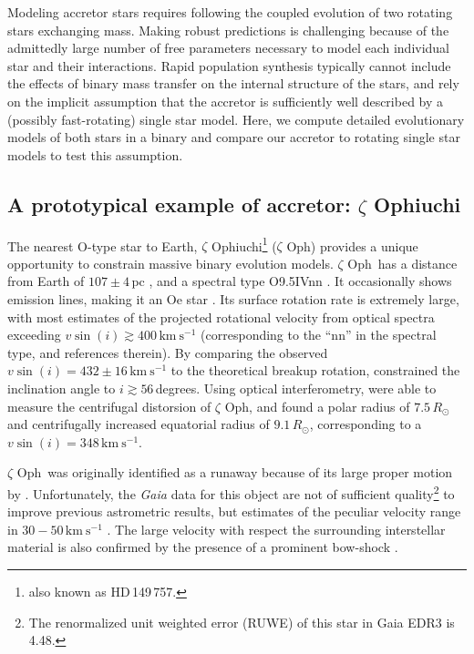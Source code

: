 \documentclass[twocolumn,twocolappendix,trackchanges]{aastex63}
\newcommand{\kms}{{\mathrm{km\ s^{-1}}}}
\newcommand{\zoph}{$\zeta$ Oph}
\begin{document}
Modeling accretor stars requires following the coupled evolution of
two rotating stars exchanging mass. Making robust predictions is
challenging because of the admittedly large number of free parameters
necessary to model each individual star and their interactions. Rapid
population synthesis typically cannot include the effects of binary
mass transfer on the internal structure of the stars, and rely on the
implicit assumption that the accretor is sufficiently well described
by a (possibly fast-rotating) single star model. Here, we compute
detailed evolutionary models of both stars in a binary and compare our
accretor to rotating single star models to test this assumption.

\subsection{A prototypical example of accretor: $\zeta$ Ophiuchi}

The nearest O-type star to Earth, $\zeta$
Ophiuchi\footnote{also known as HD\,149\,757.} (\zoph) provides a
unique opportunity to constrain massive binary evolution models.  \zoph\ has a distance
from Earth of $107\pm4$\,pc \citep[][and references
therein]{neuhauser:20}, and a spectral type O9.5{\rm IVnn}
\citep{sota:14}. It occasionally shows emission lines, making it an Oe
star \citep{walker:79, vink:09}. Its surface rotation rate is
extremely large, with most estimates of the projected rotational
velocity from optical spectra exceeding $v\sin(i)\gtrsim 400\,\kms$
(corresponding to the ``nn'' in the spectral type, \citealt{zehe:18}
and references therein). By comparing the
observed $v\sin(i)=432\pm16\,\kms$ to the theoretical breakup
rotation, \cite{zehe:18} constrained the inclination angle to
$i\gtrsim 56$\,degrees. Using optical interferometry, \cite{gordon:18}
were able to measure the centrifugal distorsion of \zoph, and found a
polar radius of $7.5\,R_\odot$ and centrifugally increased equatorial
radius of $9.1\,R_\odot$, corresponding to a $v\sin(i)=348\,\kms$.

\zoph\ was originally
identified as a runaway because of its large proper motion by
\cite{blaauw:52}. Unfortunately, the \emph{Gaia} data for this object
are not of sufficient quality\footnote{The renormalized unit weighted
  error (RUWE) of this star in Gaia EDR3 is 4.48.} to improve previous astrometric results,
but estimates of the peculiar velocity range in $30-50\,\kms$
\citep[e.g.,][]{zehe:18, neuhauser:20}. The large velocity with
respect the surrounding interstellar material is also confirmed by the
presence of a prominent bow-shock \citep[e.g.,][]{bodensteiner:18}.
\end{document}

